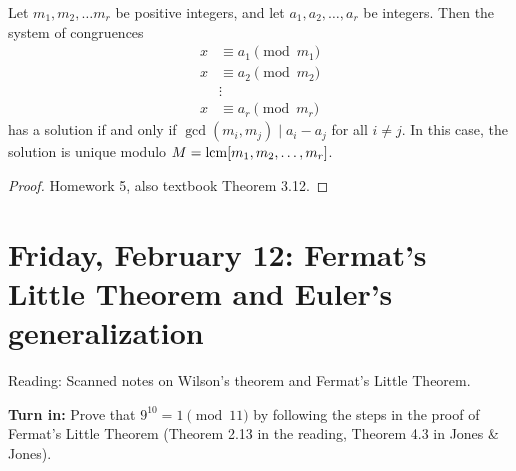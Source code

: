 \documentclass[letterpaper, 11 pt]{article}
\begin{document}
\begin{thm}
 Let $m_1,m_2,\dots m_r$ be positive integers, and let $a_1, a_2,\dots, a_r$ be integers. Then the system of congruences 
\begin{align*}
 x&\equiv a_1 \pmod{m_1}\\
 x&\equiv a_2 \pmod{m_2}\\
    &\vdots\\
  x&\equiv a_r \pmod{m_r}
\end{align*}
has a solution if and only if $\gcd(m_i,m_j)\mid a_i-a_j$ for all $i\neq j$. In this case, the solution is unique modulo $M=\operatorname{lcm}[m_1,m_2,\dots,m_r]$.
\end{thm}
\begin{proof}
Homework 5, also textbook Theorem 3.12.
\end{proof}



\section{Friday, February 12: Fermat's Little Theorem and Euler's generalization}
Reading: Scanned notes on Wilson's theorem and Fermat's Little Theorem.

{\bf Turn in:} Prove that $9^{10} = 1 \pmod{11}$ by following the steps in the proof of Fermat's Little Theorem (Theorem 2.13 in the reading, Theorem 4.3 in Jones \& Jones).
\end{document}

